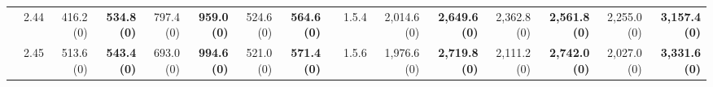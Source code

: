 \begin{table}[]
{\begin{tabular}{l|l|rr|rr|rr||l|l|rr|rr|rr}
                             & 2.44                     & \multicolumn{1}{r|}{416.2 (0)}   & \textbf{534.8 (0)}        & \multicolumn{1}{r|}{797.4 (0)}   & \textbf{959.0 (0)}        & \multicolumn{1}{r|}{524.6 (0)}   & \textbf{564.6 (0)}        &                          & 1.5.4                    & \multicolumn{1}{r|}{2,014.6 (0)} & \textbf{2,649.6 (0)}      & \multicolumn{1}{r|}{2,362.8 (0)} & \textbf{2,561.8 (0)}      & \multicolumn{1}{r|}{2,255.0 (0)} & \textbf{3,157.4 (0)}     \\ \cmidrule(lr){2-8} \cmidrule{10-16} 
                             & 2.45                     & \multicolumn{1}{r|}{513.6 (0)}   & \textbf{543.4 (0)}        & \multicolumn{1}{r|}{693.0 (0)}   & \textbf{994.6 (0)}        & \multicolumn{1}{r|}{521.0 (0)}   & \textbf{571.4 (0)}        &                          & 1.5.6                    & \multicolumn{1}{r|}{1,976.6 (0)} & \textbf{2,719.8 (0)}      & \multicolumn{1}{r|}{2,111.2 (0)} & \textbf{2,742.0 (0)}      & \multicolumn{1}{r|}{2,027.0 (0)} & \textbf{3,331.6 (0)}     \\ \midrule \bottomrule
    \end{tabular}%
    }
\end{table}

